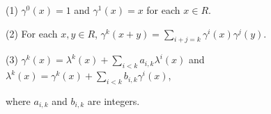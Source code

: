 (1) $\gamma^0(x) = 1$ and $\gamma^1(x) = x$ for each $x \in R$.

(2) For each $x, y \in R$, $\gamma^k(x + y) = \sum_{i+j=k} \gamma^i(x)\gamma^j(y)$.

(3) $\gamma^k(x) = \lambda^k(x) + \sum_{i < k} a_{i,k}\lambda^i(x)$ and $\lambda^k(x) = \gamma^k(x) + \sum_{i < k} b_{i,k}\gamma^i(x)$,

where $a_{i,k}$ and $b_{i,k}$ are integers.
